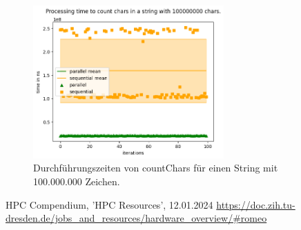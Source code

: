 \documentclass[plainarticle,zihtitle,german,final,hyperref,utf8]{zihpub}
\begin{document}
\newpage
\begin{figure}[h]
	\begin{center}
		\includegraphics[width=0.65\textwidth]{images/comp_count_100000000.png}
		\caption{Durchführungszeiten von countChars für einen String mit 100.000.000 Zeichen.}
		\label{fig:count_comp_100M}
	\end{center}
\end{figure}

\newpage
\begin{thebibliography}{9}
	HPC Compendium, 'HPC Resources', 12.01.2024\newline
	\url{https://doc.zih.tu-dresden.de/jobs_and_resources/hardware_overview/#romeo}
\end{thebibliography}
\end{document}

